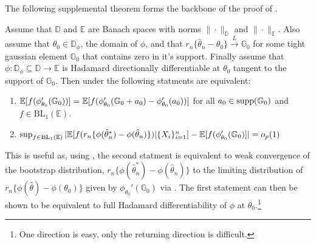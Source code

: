 The following supplemental theorem forms the backbone of the proof of . 
\begin{theorem}
	\label{thm:fs-s.3.1}
	Assume that \(\mathbb{D}\) and \(\mathbb{E}\) are Banach spaces with norms \(\|\cdot\|_{\mathbb{D}}\) and \(\|\cdot\|_{\mathbb{E}}\). Also assume that \(\theta_0\in \mathbb{D}_{\phi}\), the domain of \(\phi\), and that \(r_n\{\hat\theta_n-\theta_0\}\overset{L}{\to} \mathbb{G}_0\) for some tight gaussian element \(\mathbb{G}_0\) that contains zero in it's support. Finally assume that \(\phi:\mathbb{D}_\phi\subseteq\mathbb{D}\to \mathbb{E}\) is Hadamard directionally differentiable at \(\theta_0\) tangent to the support of \(\mathbb{G}_0\). Then under  the following statments are equivalent:
	\begin{enumerate}
		\item \(\mathbb{E}[f(\phi_{\theta_0}'(\mathbb{G}_0))]= \mathbb{E}[f(\phi_{\theta_0}'(\mathbb{G}_0+a_0)-\phi_{\theta_0}'(a_0))]\) for all \(a_0\in \operatorname{supp}(\mathbb{G}_0)\) and \(f\in \text{BL}_1(\mathbb{E})\).
		\item \(\sup_{f\in\text{BL}_1(\mathbb{E})}|\mathbb{E}[f(r_n\{\phi(\hat\theta_n^*)-\phi(\hat\theta_n)\})| \{X_i\}_{i=1}^n]-\mathbb{E}[f(\phi_{\theta_0}'(\mathbb{G}_0)]|=o_p(1)\)
	\end{enumerate}
\end{theorem}
This is useful as, using , the second statment is equivalent to weak convergence of the bootstrap distribution, \(r_n\{\phi(\hat\theta_n^*)-\phi(\hat\theta_n)\}\) to the limiting distribution of \(r_n\{\phi(\hat\theta)-\phi(\theta_0)\}\) given by \(\phi_{\theta_0}'(\mathbb{G}_0)\) via . The first statement can then be shown to be equivalent to full Hadamard differentiability of \(\phi\) at \(\theta_0\).\footnote{One direction is easy, only the returning direction is difficult.}

